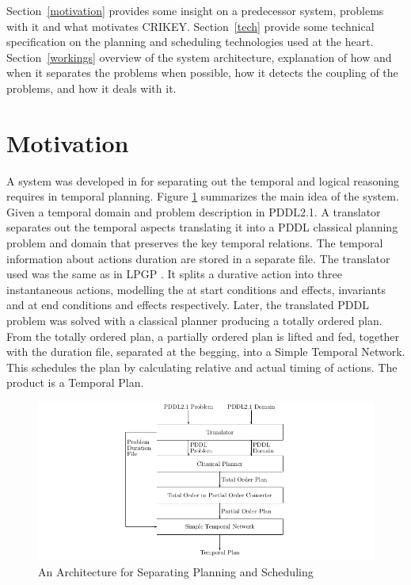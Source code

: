 \documentclass
[a4paper
,english
,parskip=half
,bibliography=totoc
]{scrreprt}
\begin{document}
    Section~\ref{motivation} provides some insight on a predecessor system, problems with it and what motivates CRIKEY.
    Section~\ref{tech} provide some technical specification on the planning and scheduling technologies used at the heart.
    Section~\ref{workings} overview of the system architecture, explanation of how and when it separates the problems when possible, how it detects the coupling of the problems, and how it deals with it.
    
    \section{Motivation} \label{Motivation}
    A system was developed in \citep{Halsey2003TemporalPW} for separating out the temporal and logical reasoning requires in temporal planning. Figure \ref{fig:architecture} summarizes the main idea of the system. Given a temporal domain and problem description in PDDL2.1. A translator separates out the temporal aspects translating it into a PDDL classical planning problem and domain that preserves the key temporal relations. 
    The temporal information about actions duration are stored in a separate file. The translator used was the same as in LPGP \citep{Long:2003:EGF:3036969.3036977}. It splits a durative action into three instantaneous actions, modelling the at start conditions and effects, invariants and at end conditions and effects respectively. Later, the translated PDDL problem was solved with a classical planner producing a totally ordered plan.
    From the totally ordered plan, a partially ordered plan is lifted and fed, together with the duration file, separated at the begging, into a Simple Temporal Network. This schedules the plan by calculating relative and actual timing of actions. The product is a Temporal Plan.

    \begin{figure}[h]
        \centering    
        \includegraphics[width=15cm]{architecture.png}
        \caption{An Architecture for Separating Planning and Scheduling}
         \label{fig:architecture}
    \end{figure}
    
\end{document}
